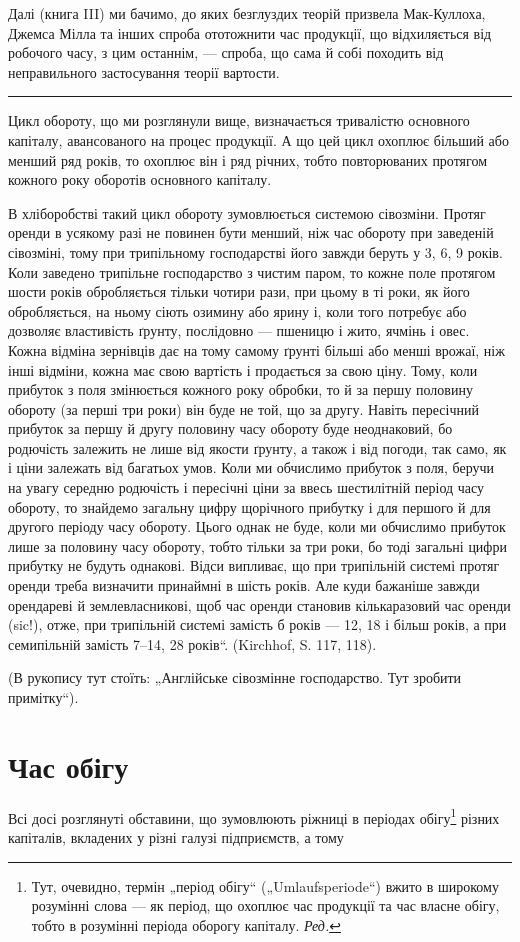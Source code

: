 Далі (книга III) ми бачимо, до яких безглуздих теорій призвела Мак-Куллоха,
Джемса Мілла та інших спроба ототожнити час продукції, що відхиляється від робочого часу, з
цим останнім, — спроба, що сама й собі походить від неправильного застосування теорії вартости.

\pfbreak

Цикл обороту, що ми розглянули вище, визначається тривалістю основного капіталу, авансованого на
процес продукції. А що цей цикл охоплює більший або менший ряд років, то охоплює він і ряд річних,
тобто повторюваних протягом кожного року оборотів основного капіталу.

В хліборобстві такий цикл обороту зумовлюється системою сівозміни. Протяг оренди в усякому разі не
повинен бути менший, ніж час обороту при заведеній сівозміні, тому при трипільному господарстві його
завжди беруть у 3, 6, 9 років. Коли заведено трипільне господарство з чистим паром, то кожне поле
протягом шости років обробляється тільки чотири рази, при цьому в ті роки, як його обробляється, на
ньому сіють озимину або ярину і, коли того потребує або дозволяє властивість ґрунту, послідовно —
пшеницю і жито, ячмінь і овес. Кожна відміна зернівців дає на тому самому ґрунті більші або менші
врожаї, ніж інші відміни, кожна має свою вартість і продається за свою ціну. Тому, коли прибуток з
поля змінюється кожного року обробки, то й за першу половину обороту (за перші три роки) він буде не
той, що за другу. Навіть пересічний прибуток за першу й другу половину часу обороту буде
неоднаковий, бо родючість залежить не лише від якости ґрунту, а також і від погоди, так само, як і
ціни залежать від багатьох умов. Коли ми обчислимо прибуток з поля, беручи на увагу середню
родючість і пересічні ціни за ввесь шестилітній період часу обороту, то знайдемо загальну цифру
щорічного прибутку і для першого й для другого періоду часу обороту. Цього однак не буде, коли ми
обчислимо прибуток лише за половину часу обороту, тобто тільки за три роки, бо тоді загальні цифри
прибутку не будуть однакові. Відси випливає, що при трипільній системі протяг оренди треба визначити
принаймні в шість років. Але куди бажаніше завжди орендареві й землевласникові, щоб час оренди
становив кількаразовий час оренди (sic!), отже, при трипільній системі замість б років — 12, 18 і
більш років, а при семипільній замість 7--14, 28 років“. (Kirchhof, S. 117, 118).

(В рукопису тут стоїть: „Англійське сівозмінне господарство. Тут зробити примітку“).

\section{Час обігу}

Всі досі розглянуті обставини, що зумовлюють ріжниці в періодах обігу\footnote{
Тут, очевидно, термін „період обігу“ („Umlaufsperiode“) вжито в широкому розумінні слова — як
період, що охоплює час продукції та час власне обігу, тобто в розумінні періода оборогу капіталу.
\emph{Ред.}
} різних капіталів, вкладених у
різні галузі підприємств, а тому
\parbreak{}  %
